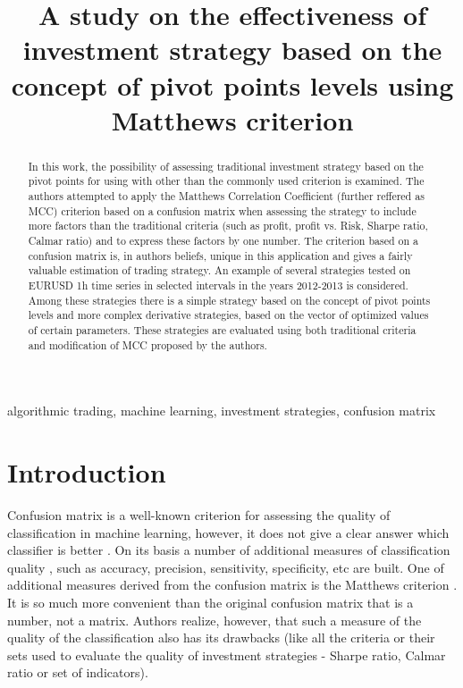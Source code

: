 \documentclass{jtacs}
\begin{document}
\title{A study on the effectiveness of investment strategy based on the concept of pivot points levels using  Matthews criterion}
\maketitle


\begin{abstract}%
In this work, the possibility of assessing traditional investment strategy based on the pivot points for using with other than the commonly used criterion is examined. The authors attempted to apply the Matthews Correlation Coefficient (further reffered as MCC)  criterion based on a confusion matrix when assessing the strategy to include more factors than the traditional criteria (such as profit, profit vs. Risk, Sharpe ratio, Calmar ratio) and to express these factors by one number. The criterion based on a confusion matrix is, in authors beliefs, unique in this application and gives a fairly valuable estimation of trading strategy. An example of several strategies tested on EURUSD 1h time series in selected intervals in the years 2012-2013 is considered. Among these strategies there is a simple strategy based on the concept of pivot points levels and more complex derivative strategies, based on the vector of optimized values of certain parameters. These strategies are evaluated using both traditional criteria and modification of MCC proposed by the authors. 
\end{abstract}

\begin{keywords}%
algorithmic trading, machine learning, investment strategies, confusion matrix%
\end{keywords}

%
\section{Introduction}
Confusion matrix is a well-known criterion for assessing the quality of classification in machine learning, however, it does not give a clear answer which classifier is better\cite{provost} \cite{lewis} \cite{burke}. On its basis a number of additional measures of classification quality \cite{hay}, such as accuracy, precision, sensitivity, specificity, etc \cite{baldi} are built. One of additional measures derived from the confusion matrix is the Matthews criterion \cite{matthews}. It is so much more convenient than the original confusion matrix that is a number, not a matrix. Authors realize, however, that such a measure of the quality of the classification also has its drawbacks (like all the criteria or their sets used to evaluate the quality of investment strategies - Sharpe ratio, Calmar ratio or set of indicators). \\
\end{document}
